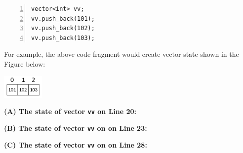 \documentclass[11pt]{article}
\begin{document}
{\footnotesize
\begin{Verbatim}[frame=single,numbers=left]
vector<int> vv;
vv.push_back(101);
vv.push_back(102);
vv.push_back(103);
\end{Verbatim}
}


For example, the above code fragment would create vector 
state shown in the Figure below:

\includegraphics[width=0.8in]{assignment03-stl/assignment03-vector-state.png}


\vspace{10pt}
{\bf (A) The state of vector {\tt vv} on Line 20:}

\vspace{50pt}
{\bf (B) The state of vector {\tt vv} on on Line 23:}

\vspace{50pt}
{\bf (C) The state of vector {\tt vv} on on Line 28:}
\end{document}
